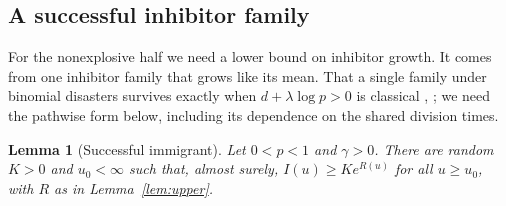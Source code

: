 \documentclass[11pt,a4paper]{article}
\numberwithin{equation}{section}
\newtheorem{lemma}[theorem]{Lemma}
\theoremstyle{definition}\newtheorem{definition}[theorem]{Definition}
\theoremstyle{remark}\newtheorem{remark}[theorem]{Remark}\newtheorem{example}[theorem]{Example}
\begin{document}
\subsection{A successful inhibitor family}\label{sec:immigrant}
For the nonexplosive half we need a lower bound on inhibitor growth. It comes from one inhibitor family that grows like its mean. That a single family under binomial disasters survives exactly when $d+\lambda\log p>0$ is classical \cite{KaplanSudburyNilsen1975}, \cite[Corollary~2.7]{HermannPfaffelhuber2020}; we need the pathwise form below, including its dependence on the shared division times.

\begin{lemma}[Successful immigrant]\label{lem:immigrant}
Let $0<p<1$ and $\gamma>0$. There are random $K>0$ and $u_0<\infty$ such that, almost surely, $I(u)\ge Ke^{R(u)}$ for all $u\ge u_0$, with $R$ as in Lemma~\ref{lem:upper}.
\end{lemma}
\end{document}
